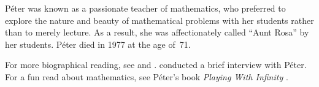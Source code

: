 \documentclass[../../../include/open-logic-section]{subfiles}
\begin{document}
P\'{e}ter was known as a passionate teacher of mathematics, who
preferred to explore the nature and beauty of mathematical problems
with her students rather than to merely lecture. As a result, she was
affectionately called ``Aunt Rosa'' by her students. P\'eter died
in 1977 at the age of~71.

\begin{reading}
For more biographical reading, see \cite{Oconnor2014} and
\cite{Andrasfai1986}. \cite{Tamassy1994} conducted a brief interview
with P\'eter. For a fun read about mathematics, see P\'eter's book
\emph{Playing With Infinity} \cite{Peter2010}.
\end{reading}
\end{document}
